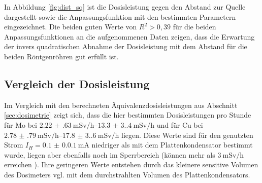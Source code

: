 In Abbildung \ref{fig:dist_sq} ist die Dosisleistung gegen den Abstand zur Quelle dargestellt sowie die Anpassungsfunktion mit den bestimmten Parametern eingezeichnet. Die beiden guten Werte von $R^2>0,39$ für die beiden Anpassungsfunktionen an die aufgenommenen Daten zeigen, dass die Erwartung der invers quadratischen Abnahme der Dosisleistung mit dem Abstand für die beiden Röntgenröhren gut erfüllt ist.




\subsection*{Vergleich der Dosisleistung}

Im Vergleich mit den berechneten Äquivalenzdosisleistungen aus Abschnitt \ref{sec:dosimetrie} zeigt sich, dass die hier bestimmten Dosisleistungen pro Stunde für Mo bei $\SIrange{2.22(63)}{13.3(3.4)}{\milli\sievert\per\hour}$ und für Cu bei $\SIrange{2.78(79)}{17.8(3.6)}{\milli\sievert\per\hour}$ liegen. Diese Werte sind für den genutzten Strom $I_H=\SI{0.1(0.01)}{\milli\ampere}$ niedriger als mit dem Plattenkondensator bestimmt wurde, liegen aber ebenfalls noch im Sperrbereich (können mehr als $\SI{3}{\milli\sievert\per\hour}$ erreichen \cite[§52 Abs. 2]{strahlenschutzverordnung}). Ihre geringeren Werte entstehen durch das kleinere sensitive Volumen des Dosimeters vgl. mit dem durchstrahlten Volumen des Plattenkondensators.
